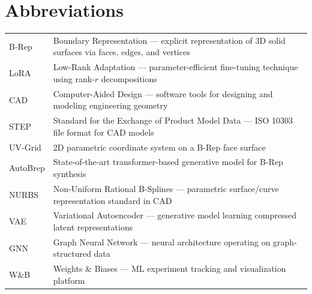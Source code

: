 \section*{Abbreviations}
\begin{tabular}{p{}p{}}
	B-Rep & Boundary Representation --- explicit representation of 3D solid surfaces via faces, edges, and vertices \\
	LoRA & Low-Rank Adaptation --- parameter-efficient fine-tuning technique using rank-$r$ decompositions \\
	CAD & Computer-Aided Design --- software tools for designing and modeling engineering geometry \\
	STEP & Standard for the Exchange of Product Model Data --- ISO 10303 file format for CAD models \\
	UV-Grid & 2D parametric coordinate system on a B-Rep face surface \\
	AutoBrep & State-of-the-art transformer-based generative model for B-Rep synthesis \\
	NURBS & Non-Uniform Rational B-Splines --- parametric surface/curve representation standard in CAD \\
	VAE & Variational Autoencoder --- generative model learning compressed latent representations \\
	GNN & Graph Neural Network --- neural architecture operating on graph-structured data \\
	W\&B & Weights \& Biases --- ML experiment tracking and visualization platform \\
\end{tabular}
